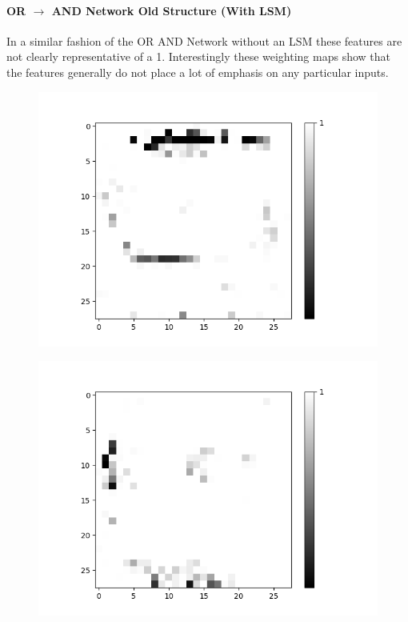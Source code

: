 \paragraph{OR $\rightarrow$ AND Network Old Structure (With LSM)}
In a similar fashion of the OR AND Network without an LSM these features are not clearly representative of a 1. Interestingly these weighting maps show that the features generally do not place a lot of emphasis on any particular inputs.
\begin{figure}[H]
	\centering
	\begin{minipage}[b]{0.19\textwidth}
		\captionsetup{labelformat=empty}
		\includegraphics[width=\textwidth]{OR-AND(OLD)(W-LSM)(1)/Layer0-Neuron-0.png}
		\label{}
	\end{minipage}
	\begin{minipage}[b]{0.19\textwidth}
		\captionsetup{labelformat=empty}
		\includegraphics[width=\textwidth]{OR-AND(OLD)(W-LSM)(1)/Layer0-Neuron-2.png}

\end{minipage}
\end{figure}
